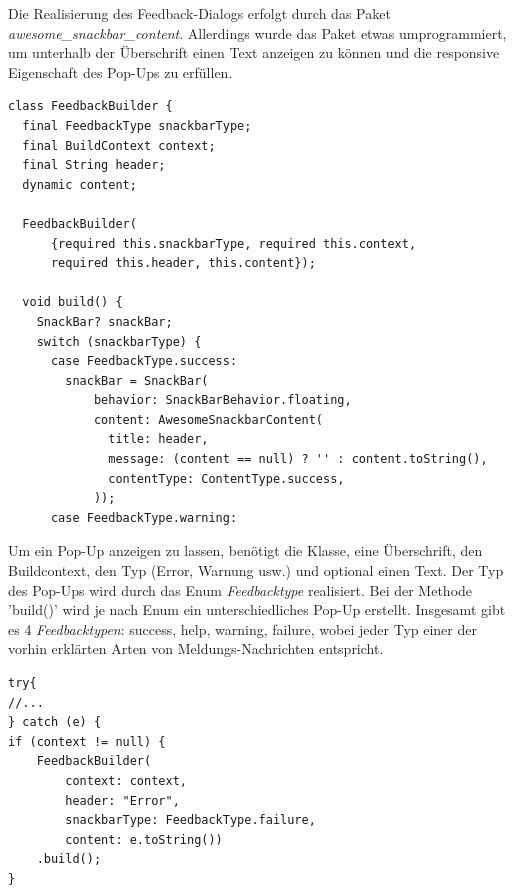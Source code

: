 Die Realisierung des Feedback-Dialogs erfolgt durch das Paket {\textit{awesome\_snackbar\_content}}. Allerdings wurde das Paket etwas umprogrammiert, um unterhalb der \"Uberschrift einen Text anzeigen zu können und die responsive Eigenschaft des Pop-Ups zu erfüllen.
\newpage
\begin{lstlisting}[caption=Feedback Builder Klasse,style=goMono]
class FeedbackBuilder {
  final FeedbackType snackbarType;
  final BuildContext context;
  final String header;
  dynamic content;
  
  FeedbackBuilder(
      {required this.snackbarType, required this.context,
      required this.header, this.content});
      
  void build() {
    SnackBar? snackBar;
    switch (snackbarType) {
      case FeedbackType.success:
        snackBar = SnackBar(
            behavior: SnackBarBehavior.floating,
            content: AwesomeSnackbarContent(
              title: header,
              message: (content == null) ? '' : content.toString(),
              contentType: ContentType.success,
            ));
      case FeedbackType.warning:
\end{lstlisting}

\newpage

Um ein Pop-Up anzeigen zu lassen, benötigt die Klasse, eine Überschrift, den Buildcontext, den Typ (Error, Warnung usw.) und optional einen Text. Der Typ des Pop-Ups wird durch das Enum {\textit{Feedbacktype}} realisiert. Bei der Methode 'build()' wird je nach Enum ein unterschiedliches Pop-Up erstellt. Insgesamt gibt es 4 {\textit{Feedbacktypen}}: success, help, warning, failure, wobei jeder Typ einer der vorhin erklärten Arten von Meldungs-Nachrichten entspricht.  
\begin{lstlisting}[caption=Awendung des FeedbackBuilders bei einer Exception,style=goMono]
try{
//...
} catch (e) {
if (context != null) {
    FeedbackBuilder(
        context: context,
        header: "Error",
        snackbarType: FeedbackType.failure,
        content: e.toString())
    .build();
}
\end{lstlisting}


\label{subsec:impl:visualizeapidata}

